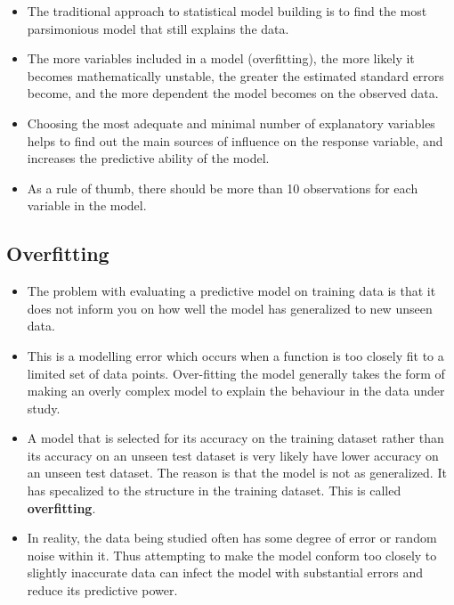 \documentclass[a4paper,12pt]{article}
\begin{document}
\begin{itemize}
	\item The traditional approach to statistical model building is to find the most parsimonious model that still explains the data. 
	\item The more variables included in a model (overfitting), the more likely it becomes mathematically unstable, the greater the estimated standard errors become, and the more dependent the model becomes on the observed data. 
	\item Choosing the most adequate and minimal number of explanatory variables helps to find out the main sources of influence on the response variable, and increases the predictive ability of the model.
	\item As a rule of thumb, there should be more than 10 observations for each variable in the model.
\end{itemize}

%



\subsection{Overfitting}
\begin{itemize}
	\item The problem with evaluating a predictive model on training data is that it does not inform you on how well the model has generalized to new unseen data.
	\item 		This is a modelling error which occurs when a function is too closely fit to a limited set of data points. Over-fitting the model generally takes the form of making an overly complex model to explain the behaviour in the data under study. 
	\item 	A model that is selected for its accuracy on the training dataset rather than its accuracy on an unseen test dataset is very likely have lower accuracy on an unseen test dataset. The reason is that the model is not as generalized. It has specalized to the structure in the training dataset. This is called \textbf{overfitting}.
	
\item	In reality, the data being studied often has some degree of error or random noise within it. Thus attempting to make the model conform too closely to slightly inaccurate data can infect the model with substantial errors and reduce its predictive power.
\end{itemize}
	
\end{document}
